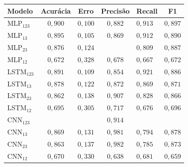 \begin{minipage}{0.45\textwidth}
	\begin{tabular}{|p{1.5cm}|c|c|c|p{1cm}|c|}
		\hline
		Modelo&Acurácia&Erro&Precisão&Recall&F1 \\
		\hline
		MLP$_{123}$&$0,900$&$0,100$&$0,882$&$0,913$&$0,897$\\ \hline
		MLP$_{13}$&$0,895$&$0,105$&$0,869$&$0,912$&$0,890$\\ \hline
		MLP$_{23}$&$0,876$&$0,124$&\cellcolor{lightgray}{$0,983$}&$0,809$&$0,887$\\ \hline
		MLP$_{12}$&$0,672$&$0,328$&$0,678$&$0,667$&$0,672$\\ \hline
		
		LSTM$_{123}$&$0,891$&$0,109$&$0,854$&$0,921$&$0,886$\\ \hline
		LSTM$_{13}$&$0,878$&$0,122$&$0,872$&$0,869$&$0,871$\\ \hline
		LSTM$_{23}$&$0,862$&$0,138$&$0,907$&$0,828$&$0,866$\\ \hline
		LSTM$_{12}$&$0,695$&$0,305$&$0,717$&$0,676$&$0,696$\\ \hline
		
		CNN$_{123}$&\cellcolor{lightgray}{$0,926$}&\cellcolor{lightgray}{$0,074$}&$0,914$&\cellcolor{lightgray}{$0,931$}&\cellcolor{lightgray}{$0,923$}\\  \hline
		CNN$_{13}$&$0,869$&$0,131$&$0,981$&$0,794$&$0,878$\\ \hline
		CNN$_{23}$&$0,863$&$0,137$&$0,982$&$0,785$&$0,873$\\ \hline
		CNN$_{12}$&$0,670$&$0,330$&$0,638$&$0,681$&$0,659$\\ \hline
	\end{tabular}
	\label{tab:desempenhotestes}
\end{minipage}
\hfill
